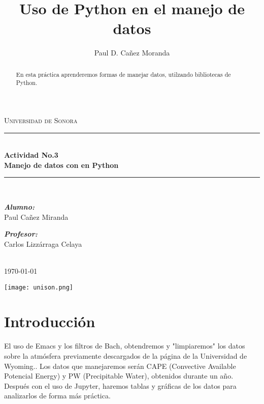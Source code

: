 \documentclass[a4paper]{article}
\title{Uso de Python en el manejo de datos}
\author{Paul D. Cañez Moranda}
\begin{document}
\begin{titlepage}
\newcommand{\HRule}{\rule{\linewidth}{0.5mm}}
\center
\textsc{\LARGE Universidad de Sonora}\\[1cm]
\HRule \\[0.4cm]
{ \huge \bfseries Actividad No.3 }\\[0.4cm]
{ \huge \bfseries Manejo de datos con en Python }\\[0.4cm]
\HRule \\[1.1cm]
\begin{minipage}{0.4\textwidth}
\begin{flushleft} \large
\emph{\bfseries {Alumno:}}\\

Paul Cañez Miranda

\end{flushleft}
\end{minipage}
\begin{minipage}{0.4\textwidth}
\begin{flushright} \large
\emph{\bfseries {Profesor:}} \\
Carlos Lizzárraga Celaya 
\end{flushright}
\end{minipage}\\[0.5cm]
{\large \today}\\[1cm] 
\begin{center}
\texttt{[image: unison.png]}
\end{center}
\end{titlepage}

\begin{abstract}
En esta práctica aprenderemos formas de manejar datos, utilzando bibliotecas de Python.
\end{abstract}

\section*{Introducción}
El uso de Emacs y los filtros de Bach, obtendremos y "limpiaremos" los datos sobre la atmósfera previamente descargados de la página de la Universidad de Wyoming.. Los datos que manejaremos serán CAPE (Convective Available Potencial Energy) y PW (Precipitable Water), obtenidos durante un año. Después con el uso de Jupyter, haremos tablas y gráficas de los datos para analizarlos de forma más práctica.
\end{document}
